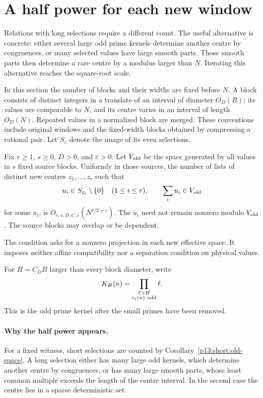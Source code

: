 \section{A half power for each new window}
\label{p13:half:section}

Relations with long selections require a different count.
The useful alternative is concrete: either several large odd
prime kernels determine another centre by congruences, or many
selected values have large smooth parts. Those smooth parts
then determine a rare centre by a modulus larger than \(N\).
Iterating this alternative reaches the square-root scale.

In this section the number of blocks and their widths are
fixed before \(N\). A block consists of distinct integers
in a translate of an interval of diameter \(O_D(B)\);
its values are comparable to \(N\), and its centre varies
in an interval of length \(O_D(N)\).
Repeated values in a normalized block are merged.
These conventions include original windows and the
fixed-width blocks obtained by compressing a rational pair.
Let \(S_z\) denote the image of its even selections.

\begin{theorem}
\label{p13:half:conditional}
Fix \(r\ge1\), \(s\ge0\), \(D>0\), and \(\varepsilon>0\).
Let \(V_{\rm old}\) be the space generated by all values
in \(s\) fixed source blocks. Uniformly in those sources,
the number of lists of distinct new centres \(z_1,\ldots,z_r\)
such that
\begin{equation}
 u_i\in S_{z_i}\setminus\{0\}\quad(1\le i\le r),
 \qquad \sum_i u_i\in V_{\rm old}
 \label{p13:half:condition}
\end{equation}
for some \(u_i\), is \(O_{r,s,D,C,\varepsilon}(N^{r/2+\varepsilon})\).
The \(u_i\) need not remain nonzero modulo \(V_{\rm old}\).
The source blocks may overlap or be dependent.
\end{theorem}

The condition asks for a nonzero projection in each new
effective space. It imposes neither affine compatibility
nor a separation condition on physical values.

For $H=C_DB$ larger than every block diameter, write
\[
 K_H(n)=\prod_{\substack{\ell>H\\v_\ell(n)\ {\rm odd}}}\ell.
\]
This is the odd prime kernel after the small primes have been removed.


\paragraph{Why the half power appears.}
For a fixed witness, short selections are counted by
Corollary~\ref{p13:short:old-space}.  A long selection either has many
large odd kernels, which determine another centre by congruences, or
has many large smooth parts, whose least common multiple exceeds the
length of the centre interval.  In the second case the centre lies in
a sparse deterministic set.

